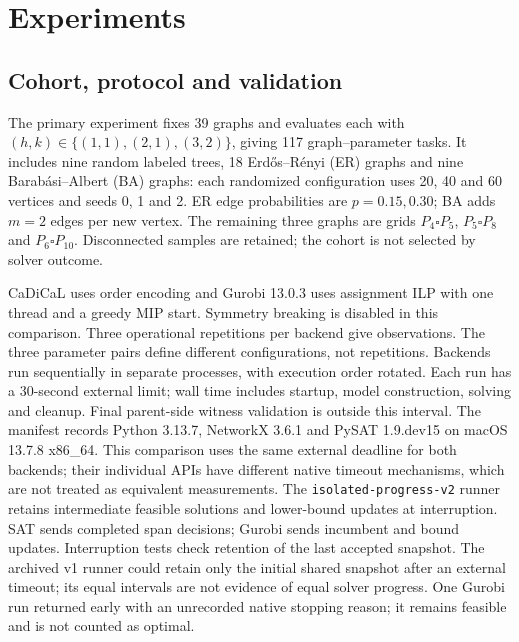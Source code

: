 \section{Experiments}
\label{sec:submission-results}
\subsection{Cohort, protocol and validation}
The primary experiment fixes 39 graphs and evaluates each with
$(h,k)\in\{(1,1),(2,1),(3,2)\}$, giving 117 graph--parameter tasks. It
includes nine
random labeled trees, 18 Erd\H{o}s--R\'enyi (ER) graphs and nine
Barab\'asi--Albert (BA) graphs: each randomized configuration uses
20, 40 and 60 vertices and seeds 0, 1 and 2. ER edge probabilities are
$p=0.15,0.30$; BA adds $m=2$ edges per new vertex. The remaining three
graphs are grids $P_4\square P_5$, $P_5\square P_8$ and
$P_6\square P_{10}$. Disconnected samples are retained; the cohort is
not selected by solver outcome.

CaDiCaL uses order encoding and Gurobi 13.0.3 uses assignment ILP with one
thread and a greedy MIP start. Symmetry breaking is disabled in this
comparison. Three operational repetitions per backend give
\ProgressObservations{} observations. The three parameter pairs define
different configurations, not repetitions. Backends run sequentially in separate processes, with
execution order rotated. Each run has a 30-second external limit;
wall time includes startup, model construction, solving and cleanup.
Final parent-side witness validation is outside this interval.
The manifest records Python 3.13.7, NetworkX 3.6.1 and PySAT 1.9.dev15
on macOS 13.7.8 x86\_64. This comparison uses the same external deadline
for both backends; their individual APIs have different native timeout
mechanisms, which are not treated as equivalent measurements. The
\texttt{isolated-progress-v2} runner retains intermediate feasible
solutions and lower-bound updates at interruption. SAT sends completed
span decisions; Gurobi sends incumbent and bound updates. Interruption
tests check retention of the last accepted snapshot. The archived v1
runner could retain only the initial shared snapshot after an external
timeout; its equal intervals are not evidence of equal solver progress. One Gurobi run
returned \FEAS{} early with an unrecorded native stopping reason;
it remains feasible and is not counted as optimal.

